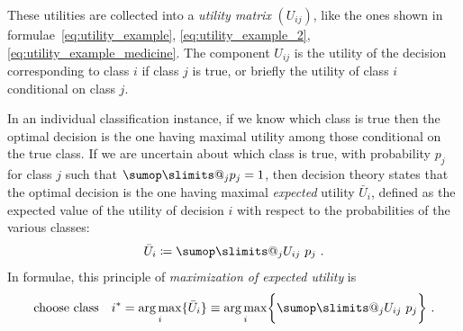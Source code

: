 \documentclass[\ifafour a4paper,12pt,\else a5paper,10pt,\fi%
onecolumn,oneside,article,%
british%
]{memoir}
\makeatletter
\theoremstyle{remark}
\theoremstyle{innote}
\def\sum{\DOTSI\sumop\slimits@}
\newcommand*{\mathte}[1]{\textbf{\textit{\textsf{#1}}}}
\newcommand*{\defd}{\coloneqq}
\DeclarePairedDelimiter\set{\{}{\}} %
\newcommand*{\p}{\mathrm{p}}%
\renewcommand*{\|}[1][]{\nonscript\:#1\vert\nonscript\:\mathopen{}}
\DeclareMathOperator*{\argmax}{arg\,max}
\newcommand*{\eu}{\bar{U}}
\makeatother
\begin{document}
These utilities are collected into a \emph{utility matrix} $(U_{ij})$, like the ones shown in formulae~\eqref{eq:utility_example}, \eqref{eq:utility_example_2}, \eqref{eq:utility_example_medicine}.
The component $U_{ij}$ is the utility of the decision corresponding to class $i$ if class $j$ is true, or briefly the utility of class $i$ conditional on class $j$.

In an individual classification instance, if we know which class is true then the optimal decision is the one having maximal utility among those conditional on the true class. If we are uncertain about which class is true, with probability $p_{j}$ for class $j$ such that $\sum_{j}p_{j}=1$, then decision theory states that the optimal decision is the one having maximal \emph{expected} utility $\eu_{i}$, defined as the expected value of the utility of decision $i$ with respect to the probabilities of the various classes:
\begin{equation}
  \label{eq:exp_utility}
  \eu_{i} \defd \sum_{j} U_{ij}\ p_{j} \ .
\end{equation}
In formulae, this principle of \emph{maximization of expected utility}  is
\begin{equation}
  \label{eq:max_expe_utility}
  \text{choose class}\quad
  i^{*} = \argmax_{i}\set{\eu_{i}} \equiv \argmax_{i}\set[\bigg]{\sum_{j} U_{ij}\ p_{j}} \ .
\end{equation}
\end{document}
